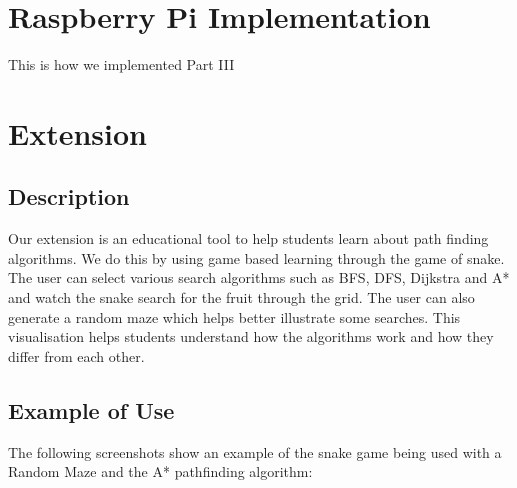 \documentclass[11pt]{article}
\begin{document}
\section{Raspberry Pi Implementation}

This is how we implemented Part III

\section{Extension}

\subsection{Description}

Our extension is an educational tool to help students learn about path finding algorithms. 
We do this by using game based learning through the game of snake. The user can select various search algorithms 
such as BFS, DFS, Dijkstra and A* and watch the snake search for the fruit through the grid. 
The user can also generate a random maze which helps better illustrate some searches. 
This visualisation helps students understand how the algorithms work and how they differ from each other. 

\subsection{Example of Use}

The following screenshots show an example of the snake game being used with a Random Maze and the A* pathfinding algorithm:

\graphicspath{ {./images/} }
\end{document}
